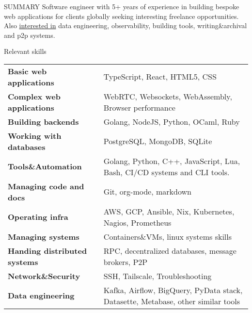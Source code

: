 \documentclass{resume} %
\begin{document}

\begin{rSection}{SUMMARY}
  {Software engineer with 5+ years of experience in building bespoke web applications for clients globally seeking interesting freelance opportunities. Also \href{https://geekodour.org/docs/documents/collaborate/#strengths-and-specialties}{interested in} data engineering, observability, building tools, writing\&archival and p2p systems.}
\end{rSection}

\begin{rSection}{Relevant skills}
  \begin{tabular}{ @{} >{\bfseries}l @{\hspace{6ex}} l }
    Basic web applications & TypeScript, React, HTML5, CSS\\
    Complex web applications & WebRTC, Websockets, WebAssembly, Browser performance\\
    Building backends & Golang, NodeJS, Python, OCaml, Ruby\\
    Working with databases & PostgreSQL, MongoDB, SQLite\\
    Tools\&Automation & Golang, Python, C++, JavaScript, Lua, Bash, CI/CD systems and CLI tools.\\
    Managing code and docs & Git, org-mode, markdown\\
    Operating infra & AWS, GCP, Ansible, Nix, Kubernetes, Nagios, Prometheus\\
    Managing systems & Containers\&VMs, linux systems skills\\
    Handing distributed systems & RPC, decentralized databases, message brokers, P2P\\
    Network\&Security & SSH, Tailscale, Troubleshooting\\
    Data engineering & Kafka, Airflow, BigQuery, PyData stack, Datasette, Metabase, other similar tools\\
  \end{tabular}\
\end{rSection}
\end{document}
